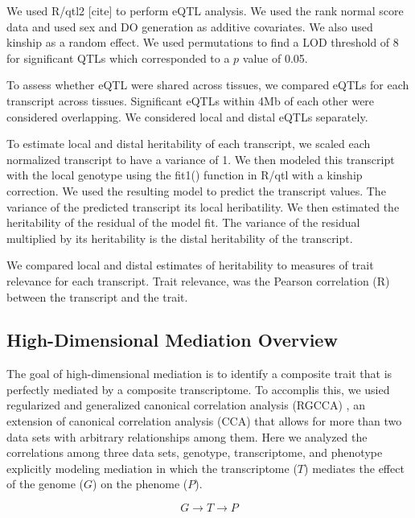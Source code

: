 \documentclass[
]{article}
\begin{document}
We used R/qtl2 {[}cite{]} to perform eQTL analysis. We used the rank
normal score data and used sex and DO generation as additive covariates.
We also used kinship as a random effect. We used permutations to find a
LOD threshold of 8 for significant QTLs which corresponded to a \(p\)
value of 0.05.

To assess whether eQTL were shared across tissues, we compared eQTLs for
each transcript across tissues. Significant eQTLs within 4Mb of each
other were considered overlapping. We considered local and distal eQTLs
separately.

To estimate local and distal heritability of each transcript, we scaled
each normalized transcript to have a variance of 1. We then modeled this
transcript with the local genotype using the fit1() function in R/qtl
with a kinship correction. We used the resulting model to predict the
transcript values. The variance of the predicted transcript its local
heribatility. We then estimated the heritability of the residual of the
model fit. The variance of the residual multiplied by its heritability
is the distal heritability of the transcript.

We compared local and distal estimates of heritability to measures of
trait relevance for each transcript. Trait relevance, was the Pearson
correlation (R) between the transcript and the trait.

\subsection{High-Dimensional Mediation
Overview}\label{high-dimensional-mediation-overview}

The goal of high-dimensional mediation is to identify a composite trait
that is perfectly mediated by a composite transcriptome. To accomplis
this, we usied regularized and generalized canonical correlation
analysis (RGCCA) \cite{rgcca}, an extension of canonical correlation
analysis (CCA) \cite{knapp1978canonical, hotelling1992relations} that
allows for more than two data sets with arbitrary relationships among
them. Here we analyzed the correlations among three data sets, genotype,
transcriptome, and phenotype explicitly modeling mediation in which the
transcriptome (\(T\)) mediates the effect of the genome (\(G\)) on the
phenome (\(P\)).

\begin{equation*}
G \rightarrow T \rightarrow P
\end{equation*}
\end{document}
